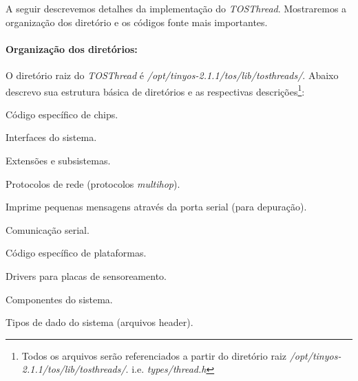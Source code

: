 A seguir descrevemos detalhes da implementação do \textit{TOSThread}. Mostraremos a organização dos diretório e os
códigos fonte mais importantes.

\paragraph{Organização dos diretórios:}
O diretório raiz do \textit{TOSThread} é \textit{/opt/tinyos-2.1.1/tos/lib/tosthreads/}.
Abaixo descrevo sua estrutura básica de diretórios e as respectivas descrições\footnote{Todos os arquivos serão referenciados a partir do diretório
raiz \textit{/opt/tinyos-2.1.1/tos/lib/tosthreads/}. i.e. \textit{types/thread.h}}:
\begin{description}
\setlength{\itemsep}{0.2pt}
\setlength{\parskip}{0pt}
\setlength{\parsep}{0pt}
    \item[chips:] Código específico de chips.
    \item[interfaces:] Interfaces do sistema.
    \item[lib:] Extensões e subsistemas.
        \begin{description}
        \setlength{\itemsep}{0.2pt}
        \setlength{\parskip}{0pt}
        \setlength{\parsep}{0pt}
            \item[net:] Protocolos de rede (protocolos \textit{multihop}).
            \item[printf:] Imprime pequenas mensagens através da porta serial (para depuração).
            \item[serial:] Comunicação serial.
        \end{description}
    \item[platforms:] Código específico de plataformas.
    \item[sensorboards:] Drivers para placas de sensoreamento.
    \item[system:] Componentes do sistema.
    \item[types:] Tipos de dado do sistema (arquivos header).
\end{description}

